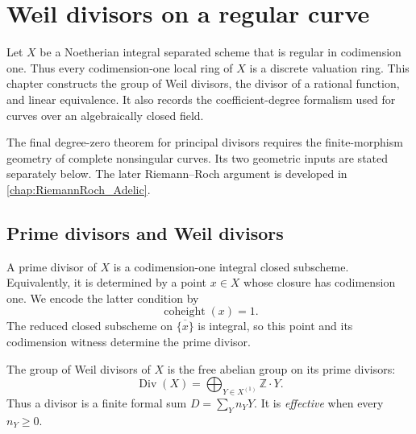 \chapter{Weil divisors on a regular curve}
\label{chap:RiemannRoch_WeilDivisor}

Let \(X\) be a Noetherian integral separated scheme that is regular in
codimension one.  Thus every codimension-one local ring of \(X\) is a
discrete valuation ring.  This chapter constructs the group of Weil
divisors, the divisor of a rational function, and linear equivalence.  It
also records the coefficient-degree formalism used for curves over an
algebraically closed field.

The final degree-zero theorem for principal divisors requires the
finite-morphism geometry of complete nonsingular curves.  Its two geometric
inputs are stated separately below.  The later Riemann--Roch argument is developed in
\cref{chap:RiemannRoch_Adelic}.

\section{Prime divisors and Weil divisors}

\begin{definition}
  \label{def:prime_divisor}
  \leanok

  A prime divisor of \(X\) is a codimension-one integral closed subscheme.
  Equivalently, it is determined by a point \(x\in X\) whose closure has
  codimension one.  We encode the latter condition by
  \[
    \operatorname{coheight}(x)=1.
  \]
  The reduced closed subscheme on \(\overline{\{x\}}\) is integral, so this
  point and its codimension witness determine the prime divisor.
\end{definition}

\begin{definition}
  \label{def:codim1_cycles}
  \leanok

  The group of Weil divisors of \(X\) is the free abelian group on its prime
  divisors:
  \[
    \operatorname{Div}(X)
      =\bigoplus_{Y\in X^{(1)}}\mathbb Z\cdot Y.
  \]
  Thus a divisor is a finite formal sum \(D=\sum_Y n_Y Y\).  It is
  \emph{effective} when every \(n_Y\geq 0\).
\end{definition}

